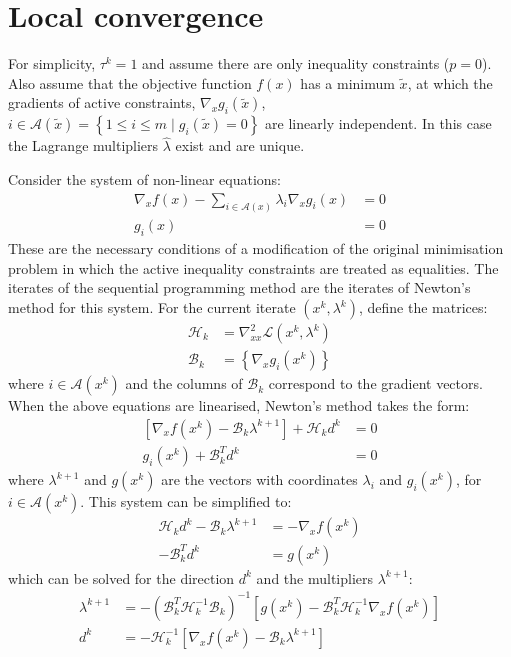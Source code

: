 \documentclass[a4paper,twoside,10pt,english]{report}
\begin{document}
\section{\label{sub:Local-Convergence}Local convergence}
For simplicity, $\tau^{k}=1$ and assume there are only inequality
constraints ($p=0$). Also assume that the objective function $f\left(x\right)$
has a minimum $\tilde{x}$, at which the gradients of active constraints,
$\nabla_{x}g_{i}\left(\tilde{x}\right)$, $i\in\mathcal{A}\left(\tilde{x}\right)=\left\{ 1\le i\le m\mid g_{i}\left(\tilde{x}\right)=0\right\} $
are linearly independent. In this case the Lagrange multipliers $\hat{\lambda}$
exist and are unique. 

Consider the system of non-linear equations: 
\begin{align*}
\nabla_{x}f\left(x\right)-\sum_{i\in\mathcal{A}\left(x\right)}\lambda_{i}\nabla_{x}g_{i}\left(x\right) &= 0\\
g_{i}\left(x\right) &= 0
\end{align*}
These are the necessary conditions of a modification of the original
minimisation problem in which the active inequality constraints are
treated as equalities. The iterates of the sequential programming
method are the iterates of Newton's method for this system. For the
current iterate $\left(x^{k},\lambda^{k}\right)$, define the matrices:
\begin{align*}
\mathcal{H}_{k} &= \nabla_{xx}^{2}\mathcal{L}\left(x^{k},\lambda^{k}\right)\\
\mathcal{B}_{k} &= \left\{ \nabla_{x}g_{i}\left(x^{k}\right)\right\} 
\end{align*}
where $i\in\mathcal{A}\left(x^{k}\right)$ and the columns of $\mathcal{B}_{k}$
correspond to the gradient vectors. When the above equations are linearised,
Newton's method takes the form:
\begin{align*}
\left[\nabla_{x}f\left(x^{k}\right)-\mathcal{B}_{k}\lambda^{k+1}\right]+\mathcal{H}_{k}d^{k} &= 0\\
g_{i}\left(x^{k}\right)+\mathcal{B}_{k}^{T}d^{k} &= 0
\end{align*}
where $\lambda^{k+1}$ and $g\left(x^{k}\right)$ are the vectors
with coordinates $\lambda_{i}$ and $g_{i}\left(x^{k}\right)$, for
$i\in\mathcal{A}\left(x^{k}\right)$. This system can be simplified
to:
\begin{align*}
\mathcal{H}_{k}d^{k}-\mathcal{B}_{k}\lambda^{k+1} &= -\nabla_{x}f\left(x^{k}\right)\\
-\mathcal{B}_{k}^{T}d^{k} &= g\left(x^{k}\right)
\end{align*}
which can be solved for the direction $d^{k}$ and the multipliers $\lambda^{k+1}$:
\begin{align}
\lambda^{k+1} &= -\left(\mathcal{B}_{k}^{T}\mathcal{H}_{k}^{-1}\mathcal{B}_{k}\right)^{-1}\left[g\left(x^{k}\right)-\mathcal{B}_{k}^{T}\mathcal{H}_{k}^{-1}\nabla_{x}f\left(x^{k}\right)\right]\\
d^{k} &= -\mathcal{H}_{k}^{-1}\left[\nabla_{x}f\left(x^{k}\right)-\mathcal{B}_{k}\lambda^{k+1}\right]
\label{eqn:local-convergence-system-of-equations}
\end{align}
\end{document}
